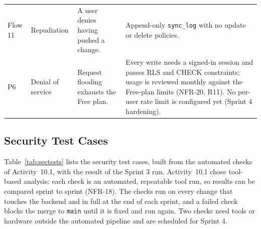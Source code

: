 \documentclass[12pt,letterpaper]{article}
\begin{document}
\begin{xltabular}{\textwidth}{@{}L{2.1cm} L{2.4cm} Y Y@{}}
Flow 11 & Repudiation & A user denies having pushed a change. & Append-only \texttt{sync\_log} with no update or delete policies. \\
P6 & Denial of service & Request flooding exhausts the Free plan. & Every write needs a signed-in session and passes RLS and CHECK constraints; usage is reviewed monthly against the Free-plan limits (NFR-20, R11). No per-user rate limit is configured yet (Sprint 4 hardening). \\
\end{xltabular}

\subsection{Security Test Cases}
Table~\ref{tab:sectests} lists the security test cases, built from the automated
checks of Activity~10.1, with the result of the Sprint 3 run. Activity~10.1 chose
tool-based analysis: each check is an automated, repeatable tool run, so results can
be compared sprint to sprint (NFR-18). The checks run on every change that touches
the backend and in full at the end of each sprint, and a failed check blocks the merge
to \texttt{main} until it is fixed and run again. Two checks need tools or hardware
outside the automated pipeline and are scheduled for Sprint 4.
\end{document}
